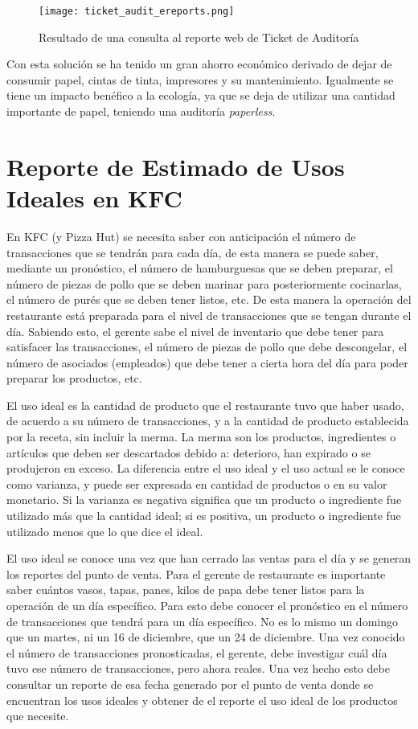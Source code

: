 \begin{figure}[htb]
 \begin{center}
  \texttt{[image: ticket\_audit\_ereports.png]}
 \end{center}
 \caption{Resultado de una consulta al reporte web de Ticket de Auditoría}
 \label{fig:rep_audit_ereports}
\end{figure}

Con esta solución se ha tenido un gran ahorro económico derivado de dejar de consumir papel, cintas de tinta, impresores y su mantenimiento. Igualmente se tiene un impacto benéfico a la ecología, ya que se deja de utilizar una cantidad importante de papel, teniendo una auditoría \textit{paperless}.

\section{Reporte de Estimado de Usos Ideales en KFC}
\label{sec:usos_ideales_kfc}

En KFC (y Pizza Hut) se necesita saber con anticipación el número de transacciones que se tendrán para cada día, de esta manera se puede saber, mediante un pronóstico, el número de hamburguesas que se deben preparar, el número de piezas de pollo que se deben marinar para posteriormente cocinarlas, el número de purés que se deben tener listos, etc. De esta manera la operación del restaurante está preparada para el nivel de transacciones que se tengan durante el día. Sabiendo esto, el gerente sabe el nivel de inventario que debe tener para satisfacer las transacciones, el número de piezas de pollo que debe descongelar, el número de asociados (empleados) que debe tener a cierta hora del día para poder preparar los productos, etc. 

El uso ideal es la cantidad de producto que el restaurante tuvo que haber usado, de acuerdo a su número de transacciones, y a la cantidad de producto establecida por la receta, sin incluir la merma. La merma son los productos, ingredientes o artículos que deben ser descartados debido a: deterioro, han expirado o se produjeron en exceso. La diferencia entre el uso ideal y el uso actual se le conoce como varianza, y puede ser expresada en cantidad de productos o en su valor monetario. Si la varianza es negativa significa que un producto o ingrediente fue utilizado más que la cantidad ideal; si es positiva, un producto o ingrediente fue utilizado menos que lo que dice el ideal.

El uso ideal se conoce una vez que han cerrado las ventas para el día y se generan los reportes del punto de venta. Para el gerente de restaurante es importante saber cuántos vasos, tapas, panes, kilos de papa debe tener listos para la operación de un día específico. Para esto debe conocer el pronóstico en el número de transacciones que tendrá para un día específico. No es lo mismo un domingo que un martes, ni un 16 de diciembre, que un 24 de diciembre. Una vez conocido el número de transacciones pronosticadas, el gerente, debe investigar cuál día tuvo ese número de transacciones, pero ahora reales. Una vez hecho esto debe consultar un reporte de esa fecha generado por el punto de venta donde se encuentran los usos ideales y obtener de el reporte el uso ideal de los productos que necesite.

